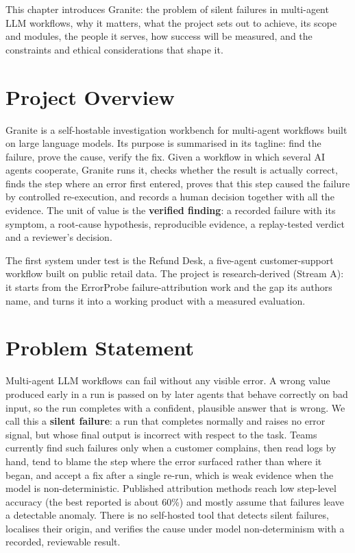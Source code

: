 \documentclass{fast-nuces-bs}
\begin{document}
This chapter introduces Granite: the problem of silent failures in multi-agent LLM workflows, why it matters, what the project sets out to achieve, its scope and modules, the people it serves, how success will be measured, and the constraints and ethical considerations that shape it.

\section{Project Overview}

Granite is a self-hostable investigation workbench for multi-agent workflows built on large language models. Its purpose is summarised in its tagline: find the failure, prove the cause, verify the fix. Given a workflow in which several AI agents cooperate, Granite runs it, checks whether the result is actually correct, finds the step where an error first entered, proves that this step caused the failure by controlled re-execution, and records a human decision together with all the evidence. The unit of value is the \textbf{verified finding}: a recorded failure with its symptom, a root-cause hypothesis, reproducible evidence, a replay-tested verdict and a reviewer's decision.

The first system under test is the Refund Desk, a five-agent customer-support workflow built on public retail data. The project is research-derived (Stream A): it starts from the ErrorProbe failure-attribution work and the gap its authors name, and turns it into a working product with a measured evaluation.

\section{Problem Statement}

Multi-agent LLM workflows can fail without any visible error. A wrong value produced early in a run is passed on by later agents that behave correctly on bad input, so the run completes with a confident, plausible answer that is wrong. We call this a \textbf{silent failure}: a run that completes normally and raises no error signal, but whose final output is incorrect with respect to the task. Teams currently find such failures only when a customer complains, then read logs by hand, tend to blame the step where the error surfaced rather than where it began, and accept a fix after a single re-run, which is weak evidence when the model is non-deterministic. Published attribution methods reach low step-level accuracy (the best reported is about 60\%) and mostly assume that failures leave a detectable anomaly. There is no self-hosted tool that detects silent failures, localises their origin, and verifies the cause under model non-determinism with a recorded, reviewable result.
\end{document}
